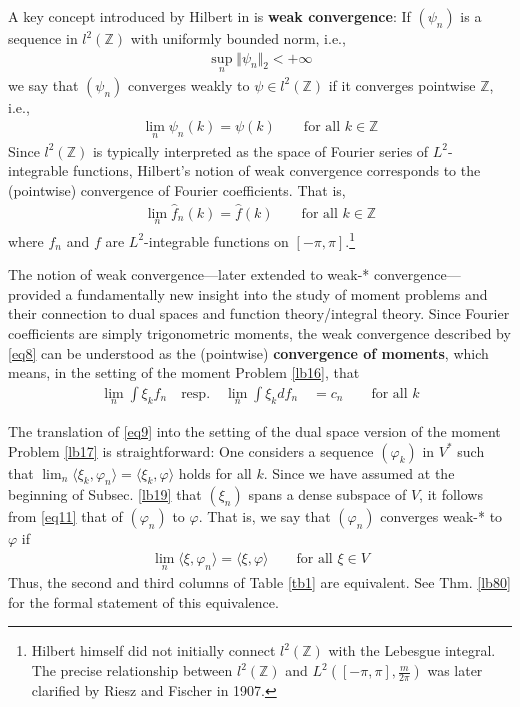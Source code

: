 \documentclass[12pt,b5paper,notitlepage]{article}
\theoremstyle{definition}
\theoremstyle{plain}
\newcommand{\wht}{\widehat}
\newcommand{\bk}[1]{\langle {#1}\rangle}
\newcommand{\Zbb}{\mathbb Z}
\numberwithin{equation}{section}
\begin{document}
A key concept introduced by Hilbert in \cite{Hil06} is \textbf{weak convergence}: If $(\psi_n)$ is a sequence in $l^2(\Zbb)$ with uniformly bounded norm, i.e.,
\begin{align}\label{eq11}
\sup_n\Vert\psi_n\Vert_2<+\infty
\end{align}
we say that $(\psi_n)$ converges weakly to $\psi\in l^2(\Zbb)$ if it converges pointwise $\Zbb$, i.e.,
\begin{align}\label{eq8}
\lim_n\psi_n(k)=\psi(k)\qquad\text{for all }k\in\Zbb
\end{align}
Since $l^2(\Zbb)$ is typically interpreted as the space of Fourier series of $L^2$-integrable functions, Hilbert's notion of weak convergence corresponds to the (pointwise) convergence of Fourier coefficients. That is,
\begin{align*}
\lim_n \wht f_n(k)=\wht f(k)\qquad\text{for all }k\in\Zbb
\end{align*}
where $f_n$ and $f$ are $L^2$-integrable functions on $[-\pi,\pi]$.\footnote{Hilbert himself did not initially connect $l^2(\Zbb)$ with the Lebesgue integral. The precise relationship between $l^2(\Zbb)$ and $L^2([-\pi,\pi],\frac m{2\pi})$ was later clarified by Riesz and Fischer in 1907.}


The notion of weak convergence---later extended to weak-* convergence---provided a fundamentally new insight into the study of moment problems and their connection to dual spaces and function theory/integral theory. Since Fourier coefficients are simply trigonometric moments, the weak convergence described by \eqref{eq8} can be understood as the (pointwise) \textbf{convergence of moments}, which means, in the setting of the moment Problem \ref{lb16}, that
\begin{align}\label{eq9}
\lim_n\int \xi_kf_n\quad\text{resp.}\quad\lim_n\int\xi_k df_n\quad=c_n\qquad\text{for all }k
\end{align}


The translation of \eqref{eq9} into the setting of the dual space version of the moment Problem \ref{lb17} is straightforward: One considers a sequence $(\varphi_k)$ in $V^*$ such that $\lim_n\bk{\xi_k,\varphi_n}=\bk{\xi_k,\varphi}$ holds for all $k$. Since we have assumed at the beginning of Subsec. \ref{lb19} that $(\xi_n)$ spans a dense subspace of $V$, it follows from \eqref{eq11} that  of $(\varphi_n)$ to $\varphi$. That is, we say that $(\varphi_n)$ converges weak-* to $\varphi$ if
\begin{align}\label{eq13}
\lim_n\bk{\xi,\varphi_n}=\bk{\xi,\varphi}\qquad\text{for all }\xi\in V
\end{align}
Thus, the second and third columns of Table \ref{tb1} are equivalent. See Thm. \ref{lb80} for the formal statement of this equivalence.
\end{document}
